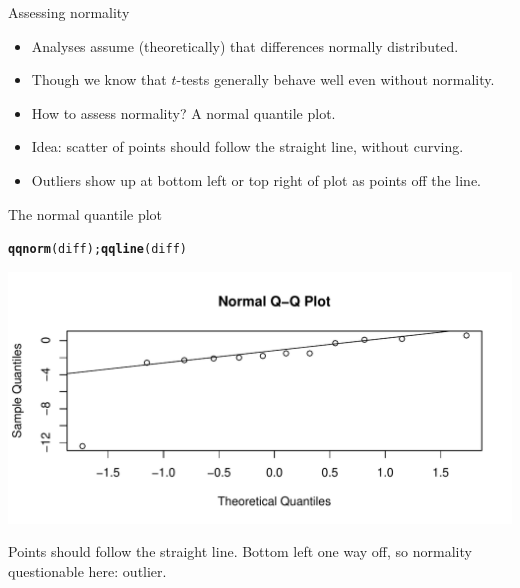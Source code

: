 \documentclass[unknownkeysallowed]{beamer}\usepackage[]{graphicx}\usepackage[]{color}
\makeatletter
\def\maxwidth{ %
  \ifdim\Gin@nat@width>\linewidth
    \linewidth
  \else
    \Gin@nat@width
  \fi
}
\newcommand{\hlstd}[1]{\textcolor[rgb]{0.345,0.345,0.345}{#1}}%
\newcommand{\hlkwd}[1]{\textcolor[rgb]{0.737,0.353,0.396}{\textbf{#1}}}%
\newenvironment{kframe}{%
 \def\at@end@of@kframe{}%
 \ifinner\ifhmode%
  \def\at@end@of@kframe{\end{minipage}}%
  \begin{minipage}{\columnwidth}%
 \fi\fi%
 \def\FrameCommand##1{\hskip\@totalleftmargin \hskip-\fboxsep
 \colorbox{shadecolor}{##1}\hskip-\fboxsep
     \hskip-\linewidth \hskip-\@totalleftmargin \hskip\columnwidth}%
 \MakeFramed {\advance\hsize-\width
   \@totalleftmargin\z@ \linewidth\hsize
   \@setminipage}}%
 {\par\unskip\endMakeFramed%
 \at@end@of@kframe}
\newenvironment{knitrout}{}{} %
\makeatother
\begin{document}
\begin{frame}[fragile]{Assessing normality}

  \begin{itemize}
  \item Analyses assume (theoretically) that differences normally
distributed. 
\item Though we know that $t$-tests generally behave well even
without normality. 
\item How to assess normality? A normal quantile plot.
\item Idea: scatter of points should follow the straight line, without curving.
\item Outliers show up at bottom left or top right of plot as points
  off the line.
  \end{itemize}


  
\end{frame}

\begin{frame}[fragile]{The normal quantile plot}

\begin{knitrout}
\color{fgcolor}\begin{kframe}
\begin{alltt}
\hlkwd{qqnorm}\hlstd{(diff) ;} \hlkwd{qqline}\hlstd{(diff)}
\end{alltt}
\end{kframe}
\includegraphics[width=\maxwidth]{figure/unnamed-chunk-109-1} 

\end{knitrout}

Points should follow the straight line. Bottom left one way
off, so normality questionable here: outlier.
  
\end{frame}
\end{document}
